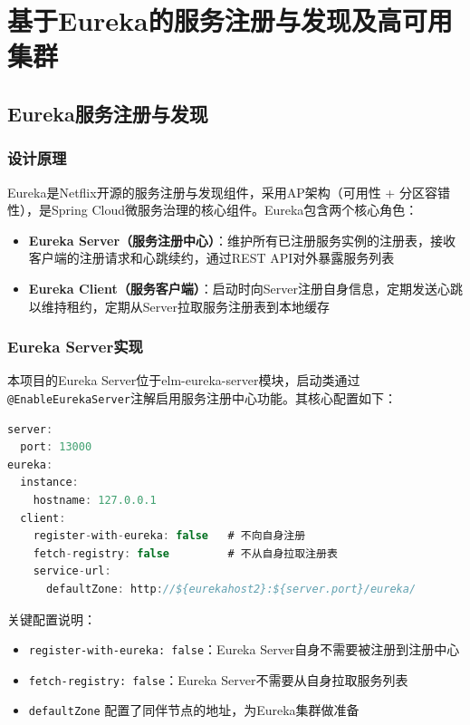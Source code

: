 
\chapter{基于Eureka的服务注册与发现及高可用集群}

\section{Eureka服务注册与发现}

\subsection{设计原理}

Eureka是Netflix开源的服务注册与发现组件，采用AP架构（可用性 + 分区容错性），是Spring Cloud微服务治理的核心组件。Eureka包含两个核心角色：

\begin{itemize}
	\item \textbf{Eureka Server（服务注册中心）}：维护所有已注册服务实例的注册表，接收客户端的注册请求和心跳续约，通过REST API对外暴露服务列表
	\item \textbf{Eureka Client（服务客户端）}：启动时向Server注册自身信息，定期发送心跳以维持租约，定期从Server拉取服务注册表到本地缓存
\end{itemize}

\subsection{Eureka Server实现}

本项目的Eureka Server位于elm-eureka-server模块，启动类通过\verb|@EnableEurekaServer|注解启用服务注册中心功能。其核心配置如下：

\begin{lstlisting}[language=Java, caption=Eureka Server配置]
server:
  port: 13000
eureka:
  instance:
    hostname: 127.0.0.1
  client:
    register-with-eureka: false   # 不向自身注册
    fetch-registry: false         # 不从自身拉取注册表
    service-url:
      defaultZone: http://${eurekahost2}:${server.port}/eureka/
\end{lstlisting}

关键配置说明：
\begin{itemize}
	\item \verb|register-with-eureka: false|：Eureka Server自身不需要被注册到注册中心
	\item \verb|fetch-registry: false|：Eureka Server不需要从自身拉取服务列表
	\item \verb|defaultZone| 配置了同伴节点的地址，为Eureka集群做准备
\end{itemize}

